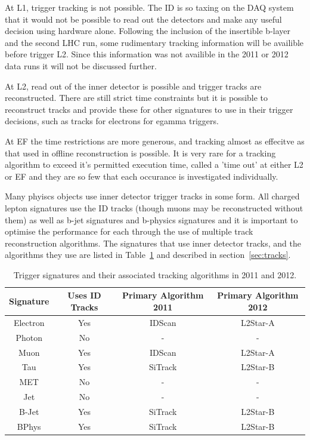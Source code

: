 At L1, trigger tracking is not possible. The ID is so taxing on the DAQ system that it would not be possible to read out the detectors and make any useful decision using hardware alone. Following the inclusion of the insertible b-layer and the second LHC run, some rudimentary tracking information will be availible before trigger L2. Since this information was not availible in the 2011 or 2012 data runs it will not be discussed further. 

At L2, read out of the inner detector is possible and trigger tracks are reconstructed. There are still strict time constraints but it is possible to reconstruct tracks and provide these for other signatures to use in their trigger decisions, such as tracks for electrons for egamma triggers.

At EF the time restrictions are more generous, and tracking almost as effecitve as that used in offline reconstruction is possible. It is very rare for a tracking algorithm to exceed it's permitted execution time, called a 'time out' at either L2 or EF and they are so few that each occurance is investigated individually.

Many phyiscs objects use inner detector trigger tracks in some form. All charged lepton signatures use the ID tracks (though muons may be reconstructed without them) as well as b-jet signatures and b-physics signatures and it is important to optimise the performance for each through the use of multiple track reconstruction algorithms. The signatures that use inner detector tracks, and the algorithms they use are listed in Table~\ref{tab:trig_tracks} and described in section~\ref{sec:tracks}.

\begin{table}
	\begin{center}
	\begin{tabular}{c c c c }
	\hline
	Signature & Uses ID Tracks & Primary Algorithm 2011 &  Primary Algorithm 2012 \\
	\hline
	Electron  & Yes & IDScan & L2Star-A \\
	Photon    & No  & - & - \\      
	Muon      & Yes & IDScan & L2Star-A \\
	Tau         & Yes & SiTrack & L2Star-B \\
	MET        & No & - & - \\
	Jet          & No & - & - \\
	B-Jet       & Yes & SiTrack & L2Star-B \\
	BPhys     & Yes & SiTrack & L2Star-B \\
	\hline
	\end{tabular}
	\end{center}
	\caption{Trigger signatures and their associated tracking algorithms in 2011 and 2012.}
	\label{tab:trig_tracks}
\end{table}

